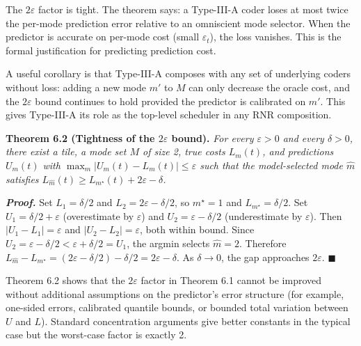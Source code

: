 \documentclass[
]{article}
\begin{document}
The $2\varepsilon$ factor is tight. The theorem says: a Type-III-A
coder loses at most twice the per-mode prediction error relative to an
omniscient mode selector. When the predictor is accurate on per-mode
cost (small $\varepsilon_t$), the loss vanishes. This is the formal
justification for predicting prediction cost.

A useful corollary is that Type-III-A composes with any set of
underlying coders without loss: adding a new mode $m'$ to $M$ can only
decrease the oracle cost, and the $2\varepsilon$ bound continues to
hold provided the predictor is calibrated on $m'$. This gives
Type-III-A its role as the top-level scheduler in any RNR composition.

\textbf{Theorem 6.2 (Tightness of the $2\varepsilon$ bound).}
\emph{For every $\varepsilon > 0$ and every $\delta > 0$, there exist
a tile, a mode set $M$ of size 2, true costs $L_m(t)$, and predictions
$U_m(t)$ with $\max_m |U_m(t) - L_m(t)| \leq \varepsilon$ such that
the model-selected mode $\hat{m}$ satisfies
$L_{\hat{m}}(t) \geq L_{m^\star}(t) + 2\varepsilon - \delta$.}

\emph{\textbf{Proof.}} Set $L_1 = \delta/2$ and
$L_2 = 2\varepsilon - \delta/2$, so $m^\star = 1$ and
$L_{m^\star} = \delta/2$. Set $U_1 = \delta/2 + \varepsilon$
(overestimate by $\varepsilon$) and $U_2 = \varepsilon - \delta/2$
(underestimate by $\varepsilon$). Then $|U_1 - L_1| = \varepsilon$ and
$|U_2 - L_2| = \varepsilon$, both within bound. Since
$U_2 = \varepsilon - \delta/2 < \varepsilon + \delta/2 = U_1$, the
argmin selects $\hat{m} = 2$. Therefore
$L_{\hat{m}} - L_{m^\star} = (2\varepsilon - \delta/2) - \delta/2 =
2\varepsilon - \delta$. As $\delta \to 0$, the gap approaches
$2\varepsilon$. \hfill$\blacksquare$

Theorem 6.2 shows that the $2\varepsilon$ factor in Theorem 6.1
cannot be improved without additional assumptions on the predictor's
error structure (for example, one-sided errors, calibrated quantile
bounds, or bounded total variation between $U$ and $L$). Standard
concentration arguments give better constants in the typical case but
the worst-case factor is exactly 2.
\end{document}

